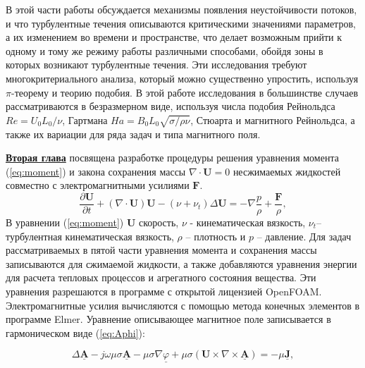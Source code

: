 В этой части работы обсуждается механизмы появления неустойчивости потоков, и что турбулентные течения описываются критическими значениями параметров, а их изменением во времени и пространстве, что делает возможным прийти к одному и тому же режиму работы различными способами, обойдя зоны в которых возникают турбулентные течения. Эти исследования требуют многокритериального анализа, который можно существенно упростить, используя $\pi$-теорему и теорию подобия. В этой работе исследования в большинстве случаев рассматриваются в безразмерном виде, используя числа подобия Рейнольдса $Re= U_{0} L_{0}/ \nu$, Гартмана $Ha = B_{0} L_{0} \sqrt{\sigma/ \rho \nu}$, Стюарта и магнитного Рейнольдса, а также их вариации для ряда задач и типа магнитного поля. 


\underline{\textbf{Вторая глава}} посвящена разработке процедуры решения уравнения момента (\ref{eq:moment}) и закона сохранения массы $ \nabla \cdot \mathbf{U} = 0$ несжимаемых жидкостей совместно с электромагнитными усилиями $\mathbf{F}$.
\begin{equation}
	\frac{\partial\mathbf{U}}{\partial t} +\left( \nabla \cdot \mathbf{U} \right) \mathbf{U} - \left( \nu + \nu_t \right) \Delta \mathbf{U} = -\nabla \frac{p}{\rho} + \frac{\mathbf{F}}{\rho},
	\label{eq:moment}
\end{equation}
В уравнении (\ref{eq:moment}) $\mathbf{U}$ скорость, $\nu$ - кинематическая вязкость, $\nu_{t}$-- турбулентная кинематическая вязкость, $\rho$ -- плотность и $p$ -- давление. 
Для задач рассматриваемых в пятой части уравнения момента и сохранения массы записываются для сжимаемой жидкости, а также добавляются уравнения энергии для расчета тепловых процессов и агрегатного состояния вещества. Эти уравнения разрешаются в программе с открытой лицензией OpenFOAM. Электромагнитные усилия вычисляются с помощью метода конечных элементов в программе Elmer. Уравнение описывающее магнитное поле записывается в гармоническом виде (\ref{eq:Aphi}):

\begin{equation}
	\Delta \mathbf{\underline{A}}-j\omega \mu \sigma \mathbf{\underline{A}}-\mu \sigma \nabla \underline{\varphi}+\mu \sigma (\mathbf{U}\times \nabla \times \mathbf{\underline{A}})=-\mu \mathbf{\underline{J}},	
	\label{eq:Aphi}
\end{equation}

